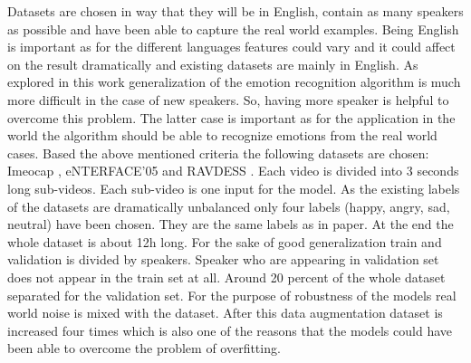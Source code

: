 \documentclass[oneside]{report}
\begin{document}
    Datasets are chosen in way that they will be in English, contain as many speakers as possible and have been able to capture the real world examples. Being English is important as for the different languages features could vary and it could affect on the result dramatically and existing datasets are mainly in English. As explored in this work generalization of the emotion recognition algorithm is much more difficult in the case of new speakers. So, having more speaker is helpful to overcome this problem. The latter case is important as for the application in the world the algorithm should be able to recognize emotions from the real world cases. Based the above mentioned criteria the following datasets are chosen: Imeocap \cite{iemocap}, eNTERFACE'05 \cite{enterface} and RAVDESS \cite{RAVDESS}. Each video is divided into 3 seconds long sub-videos. Each sub-video is one input for the model. As the existing labels of the datasets are dramatically unbalanced only four labels (happy, angry, sad, neutral) have been chosen. They are the same labels as in \cite{stanford_2020} paper. At the end the whole dataset is about 12h long. For the sake of good generalization train and validation is divided by speakers. Speaker who are appearing in validation set does not appear in the train set at all. Around 20 percent of the whole dataset separated for the validation set. For the purpose of robustness of the models real world noise is mixed with the dataset. After this data augmentation dataset is increased four times which is also one of the reasons that the models could have been able to overcome the problem of overfitting.
    
        
    
\end{document}
